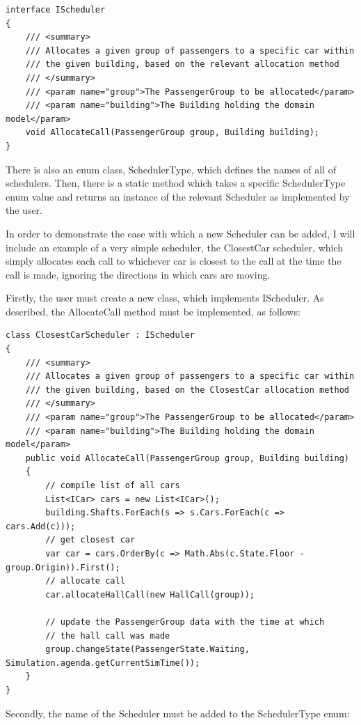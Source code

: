 \documentclass{UoYCSproject}
\begin{document}
\lstset{language=[Sharp]C, basicstyle=\ttfamily\tiny, breaklines=true, breakatwhitespace=true }
\begin{lstlisting}
interface IScheduler
{
	/// <summary>
	/// Allocates a given group of passengers to a specific car within
	/// the given building, based on the relevant allocation method
	/// </summary>
	/// <param name="group">The PassengerGroup to be allocated</param>
	/// <param name="building">The Building holding the domain model</param>
	void AllocateCall(PassengerGroup group, Building building);
}
\end{lstlisting}

There is also an enum class, SchedulerType, which defines the names of all of schedulers.  Then, there is a static method which takes a specific SchedulerType enum value and returns an instance of the relevant Scheduler as implemented by the user.

In order to demonstrate the ease with which a new Scheduler can be added, I will include an example of a very simple scheduler, the ClosestCar scheduler, which simply allocates each call to whichever car is closest to the call at the time the call is made, ignoring the directions in which cars are moving.

Firstly, the user must create a new class, which implements IScheduler.  As described, the AllocateCall method must be implemented, as follows:

\begin{lstlisting}
class ClosestCarScheduler : IScheduler
{
	/// <summary>
	/// Allocates a given group of passengers to a specific car within
	/// the given building, based on the ClosestCar allocation method
	/// </summary>
	/// <param name="group">The PassengerGroup to be allocated</param>
	/// <param name="building">The Building holding the domain model</param>
	public void AllocateCall(PassengerGroup group, Building building)
	{
		// compile list of all cars
		List<ICar> cars = new List<ICar>();
		building.Shafts.ForEach(s => s.Cars.ForEach(c => cars.Add(c)));
		// get closest car
		var car = cars.OrderBy(c => Math.Abs(c.State.Floor - group.Origin)).First();
		// allocate call
		car.allocateHallCall(new HallCall(group));
	
		// update the PassengerGroup data with the time at which
		// the hall call was made
		group.changeState(PassengerState.Waiting, Simulation.agenda.getCurrentSimTime());
	}
}
\end{lstlisting}

Secondly, the name of the Scheduler must be added to the SchedulerType enum:
\end{document}
